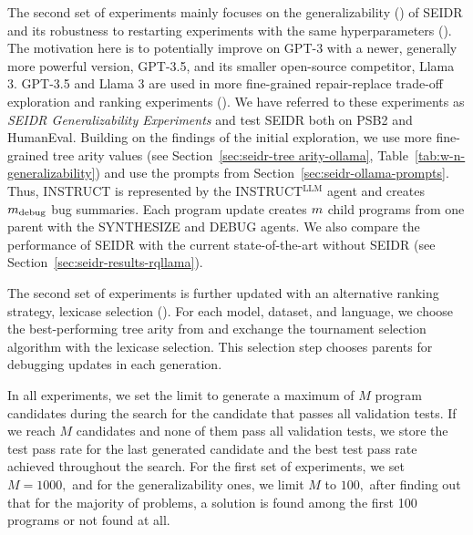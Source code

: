 The second set of experiments mainly focuses on the generalizability (\rqllama{}) of SEIDR
and its robustness to restarting experiments with the same hyperparameters (\rqmultirun{}).
The motivation here is to potentially improve on GPT-3 with a newer, generally more powerful version, GPT-3.5, and its smaller open-source competitor, Llama 3.
GPT-3.5 and Llama 3 are used in more fine-grained repair-replace trade-off exploration and ranking experiments (\rqtreearity{}). 
We have referred to these experiments as \emph{SEIDR Generalizability Experiments} and test SEIDR both on PSB2 and HumanEval.
Building on the findings of the initial exploration, we use more fine-grained tree arity values (see Section~\ref{sec:seidr-tree arity-ollama}, Table~\ref{tab:w-n-generalizability}) and use the prompts from Section~\ref{sec:seidr-ollama-prompts}. 
Thus, INSTRUCT is represented by the INSTRUCT$^{\text{LLM}}$ agent and creates $m_\text{debug}$ bug summaries.
Each program update creates $m{}$ child programs from one parent with the SYNTHESIZE and DEBUG agents.
We also compare the performance of SEIDR with the current state-of-the-art without SEIDR (see Section~\ref{sec:seidr-results-rqllama}).

The second set of experiments is further updated with an alternative ranking strategy, lexicase selection (\rqlexicase{}). 
For each model, dataset, and language, we choose the best-performing tree arity from \rqllama{} and exchange the tournament selection algorithm with the lexicase selection. 
This selection step chooses parents for debugging updates in each generation. 


In all experiments, we set the limit to generate a maximum of $M$ program candidates during the search for the candidate that passes all validation tests. 
If we reach $M$ candidates and none of them pass all validation tests, we store the test pass rate for the last generated candidate and the best test pass rate achieved throughout the search. 
For the first set of experiments, we set $M = 1000,$ and for the generalizability ones, we limit $M$  to $100,$ after finding out that for the majority of problems, a solution is found among the first 100 programs or not found at all.



